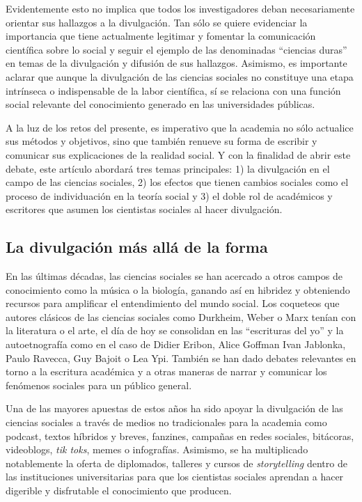 \documentclass[
]{interact}
\begin{document}
Evidentemente esto no implica que todos los investigadores deban
necesariamente orientar sus hallazgos a la divulgación. Tan sólo se
quiere evidenciar la importancia que tiene actualmente legitimar y
fomentar la comunicación científica sobre lo social y seguir el ejemplo
de las denominadas ``ciencias duras'' en temas de la divulgación y
difusión de sus hallazgos. Asimismo, es importante aclarar que aunque la
divulgación de las ciencias sociales no constituye una etapa intrínseca
o indispensable de la labor científica, sí se relaciona con una función
social relevante del conocimiento generado en las universidades
públicas.

A la luz de los retos del presente, es imperativo que la academia no
sólo actualice sus métodos y objetivos, sino que también renueve su
forma de escribir y comunicar sus explicaciones de la realidad social. Y
con la finalidad de abrir este debate, este artículo abordará tres temas
principales: 1) la divulgación en el campo de las ciencias sociales, 2)
los efectos que tienen cambios sociales como el proceso de individuación
en la teoría social y 3) el doble rol de académicos y escritores que
asumen los cientistas sociales al hacer divulgación.

\subsection{La divulgación más allá de la
forma}\label{la-divulgaciuxf3n-muxe1s-alluxe1-de-la-forma}

En las últimas décadas, las ciencias sociales se han acercado a otros
campos de conocimiento como la música o la biología, ganando así en
hibridez y obteniendo recursos para amplificar el entendimiento del
mundo social. Los coqueteos que autores clásicos de las ciencias
sociales como Durkheim, Weber o Marx tenían con la literatura o el arte,
el día de hoy se consolidan en las ``escrituras del yo'' y la
autoetnografía como en el caso de Didier Eribon, Alice Goffman Ivan
Jablonka, Paulo Ravecca, Guy Bajoit o Lea Ypi. También se han dado
debates relevantes en torno a la escritura académica y a otras maneras
de narrar y comunicar los fenómenos sociales para un público general.

Una de las mayores apuestas de estos años ha sido apoyar la divulgación
de las ciencias sociales a través de medios no tradicionales para la
academia como podcast, textos híbridos y breves, fanzines, campañas en
redes sociales, bitácoras, videoblogs, \emph{tik toks}, memes o
infografías. Asimismo, se ha multiplicado notablemente la oferta de
diplomados, talleres y cursos de \emph{storytelling} dentro de las
instituciones universitarias para que los cientistas sociales aprendan a
hacer digerible y disfrutable el conocimiento que producen.
\end{document}
